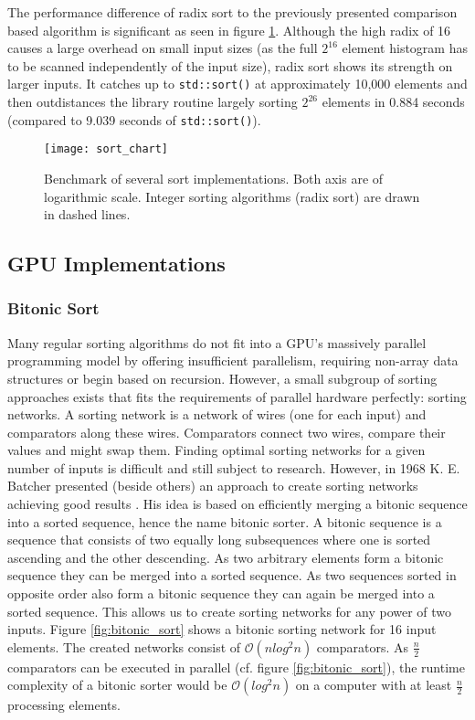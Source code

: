 The performance difference of radix sort to the previously presented comparison based algorithm is significant as seen in figure \ref{fig:sort_chart}. Although the high radix of 16 causes a large overhead on small input sizes (as the full $2^{16}$ element histogram has to be scanned independently of the input size), radix sort shows its strength on larger inputs. It catches up to \lstinline!std::sort()! at approximately 10,000 elements and then outdistances the library routine largely sorting $2^{26}$ elements in 0.884 seconds (compared to 9.039 seconds of \lstinline!std::sort()!).

\begin{figure}[h]
\centering
\texttt{[image: sort\_chart]}
\caption{Benchmark of several sort implementations.
Both axis are of logarithmic scale. Integer sorting algorithms (radix sort) are drawn in dashed lines.}
\label{fig:sort_chart}
\end{figure}

\subsection{GPU Implementations}

\subsubsection{Bitonic Sort}

Many regular sorting algorithms do not fit into a GPU's massively parallel programming model by offering insufficient parallelism, requiring non-array data structures or begin based on recursion. However, a small subgroup of sorting approaches exists that fits the requirements of parallel hardware perfectly: sorting networks. A sorting network is a network of wires (one for each input) and comparators along these wires. Comparators connect two wires, compare their values and might swap them.
Finding optimal sorting networks for a given number of inputs is difficult and still subject to research. However, in 1968 K. E. Batcher presented (beside others) an approach to create sorting networks achieving good results \cite{sort_bitonic}. His idea is based on efficiently merging a bitonic sequence into a sorted sequence, hence the name bitonic sorter. A bitonic sequence is a sequence that consists of two equally long subsequences where one is sorted ascending and the other descending. As two arbitrary elements form a bitonic sequence they can be merged into a sorted sequence. As two sequences sorted in opposite order also form a bitonic sequence they can again be merged into a sorted sequence. This allows us to create sorting networks for any power of two inputs. Figure \ref{fig:bitonic_sort} shows a bitonic sorting network for 16 input elements. The created networks consist of $\mathcal{O}(n  log^2 n)$ comparators. As $\frac{n}{2}$ comparators can be executed in parallel (cf. figure \ref{fig:bitonic_sort}), the runtime complexity of a bitonic sorter would be $\mathcal{O}(log^2 n)$ on a computer with at least $\frac{n}{2}$ processing elements.

